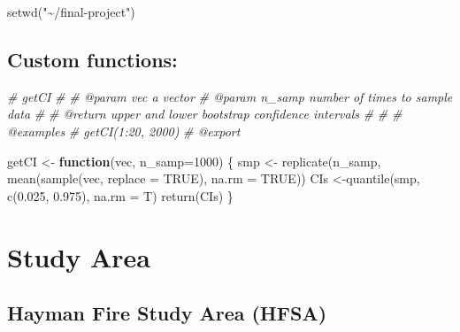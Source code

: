 \documentclass[
]{article}
\newenvironment{Shaded}{\begin{snugshade}}{\end{snugshade}}
\newcommand{\AttributeTok}[1]{\textcolor[rgb]{0.77,0.63,0.00}{#1}}
\newcommand{\CommentTok}[1]{\textcolor[rgb]{0.56,0.35,0.01}{\textit{#1}}}
\newcommand{\ConstantTok}[1]{\textcolor[rgb]{0.00,0.00,0.00}{#1}}
\newcommand{\ControlFlowTok}[1]{\textcolor[rgb]{0.13,0.29,0.53}{\textbf{#1}}}
\newcommand{\DecValTok}[1]{\textcolor[rgb]{0.00,0.00,0.81}{#1}}
\newcommand{\FloatTok}[1]{\textcolor[rgb]{0.00,0.00,0.81}{#1}}
\newcommand{\FunctionTok}[1]{\textcolor[rgb]{0.00,0.00,0.00}{#1}}
\newcommand{\NormalTok}[1]{#1}
\newcommand{\OtherTok}[1]{\textcolor[rgb]{0.56,0.35,0.01}{#1}}
\newcommand{\StringTok}[1]{\textcolor[rgb]{0.31,0.60,0.02}{#1}}
\begin{document}
\begin{Shaded}
\begin{Highlighting}[]
\FunctionTok{setwd}\NormalTok{(}\StringTok{"\textasciitilde{}/final{-}project"}\NormalTok{)}
\end{Highlighting}
\end{Shaded}

\hypertarget{custom-functions}{%
\subsection{Custom functions:}\label{custom-functions}}

\begin{Shaded}
\begin{Highlighting}[]
\CommentTok{\#\textquotesingle{} getCI}
\CommentTok{\#\textquotesingle{} }
\CommentTok{\#\textquotesingle{} @param vec a vector}
\CommentTok{\#\textquotesingle{} @param n\_samp number of times to sample data}
\CommentTok{\#\textquotesingle{}}
\CommentTok{\#\textquotesingle{} @return upper and lower bootstrap confidence intervals}
\CommentTok{\#\textquotesingle{} }
\CommentTok{\#\textquotesingle{}}
\CommentTok{\#\textquotesingle{} @examples}
\CommentTok{\#\textquotesingle{}    getCI(1:20, 2000)}
\CommentTok{\#\textquotesingle{} @export}

\NormalTok{getCI }\OtherTok{\textless{}{-}} \ControlFlowTok{function}\NormalTok{(vec, }\AttributeTok{n\_samp=}\DecValTok{1000}\NormalTok{) \{}
\NormalTok{  smp }\OtherTok{\textless{}{-}} \FunctionTok{replicate}\NormalTok{(n\_samp, }\FunctionTok{mean}\NormalTok{(}\FunctionTok{sample}\NormalTok{(vec, }\AttributeTok{replace =} \ConstantTok{TRUE}\NormalTok{), }\AttributeTok{na.rm =} \ConstantTok{TRUE}\NormalTok{))}
\NormalTok{  CIs }\OtherTok{\textless{}{-}}\FunctionTok{quantile}\NormalTok{(smp, }\FunctionTok{c}\NormalTok{(}\FloatTok{0.025}\NormalTok{, }\FloatTok{0.975}\NormalTok{), }\AttributeTok{na.rm =}\NormalTok{ T)}
  \FunctionTok{return}\NormalTok{(CIs)}
\NormalTok{\}}
\end{Highlighting}
\end{Shaded}

\hypertarget{study-area}{%
\section{Study Area}\label{study-area}}

\hypertarget{hayman-fire-study-area-hfsa}{%
\subsection{Hayman Fire Study Area
(HFSA)}\label{hayman-fire-study-area-hfsa}}
\end{document}
